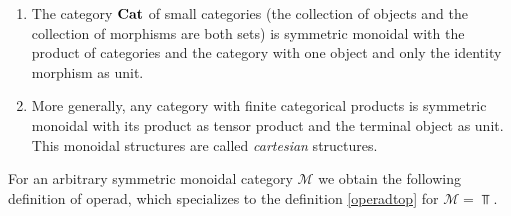 \documentclass[TFM.tex]{subfiles}
\begin{document}
\begin{ex}
\begin{enumerate}
\item The category $\mathrm{\mathbf{Cat}}$ of small categories (the collection of objects and the collection of morphisms are both sets) is symmetric monoidal with the product of categories and the category with one object and only the identity morphism as unit. %

\item  More generally, any category with finite categorical products is symmetric monoidal with its product as tensor product and the terminal object as unit. This monoidal structures are called \emph{cartesian} structures.
\end{enumerate}



\end{ex}



For an arbitrary symmetric monoidal category $\mathscr{M}$ we obtain the following definition of operad, which specializes to the definition \ref{operadtop} for $\mathscr{M}=\Top$.
\end{document}
